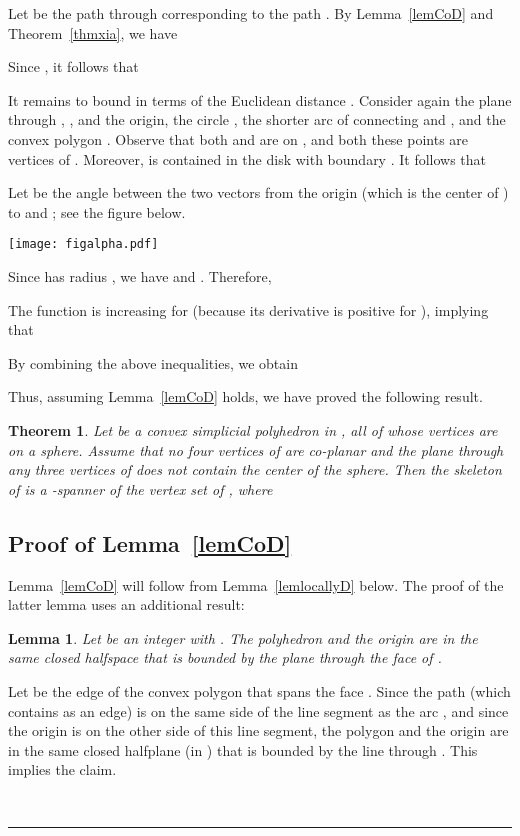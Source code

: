 \documentclass[12pt]{article}
\newtheorem{theorem}{Theorem}
\newtheorem{lemma}{Lemma}
\newcommand{\qed}{\rule{0.5em}{1.5ex}}
\newcommand{\fqed}{{\hfill~\qed}}
\newenvironment{proof}{{\noindent \bf Proof.}}
                      {{\hfill \fqed} \vspace{1em}}
\begin{document}
Let  be the path through  
corresponding to the path . By Lemma~\ref{lemCoD} and 
Theorem~\ref{thmxia}, we have 

Since , it follows that 
 

It remains to bound  in terms of the Euclidean distance 
. Consider again the plane  through , , and the 
origin, the circle , the shorter arc 
 of  connecting  and , and the convex polygon 
. Observe that both  and  are on , 
and both these points are vertices of . Moreover,  is 
contained in the disk with boundary . It follows that 
 

Let  be the angle between the two vectors from the 
origin (which is the center of ) to  and ; see the figure 
below. 

\begin{center}
\texttt{[image: figalpha.pdf]}
\end{center}

Since  has radius , we have  and 
. Therefore, 

The function  is increasing for  
(because its derivative is positive for ), implying 
that

By combining the above inequalities, we obtain 

Thus, assuming Lemma~\ref{lemCoD} holds, we have proved the following 
result. 

\begin{theorem}   \label{thm999}  
Let  be a convex simplicial polyhedron in , all of whose 
vertices are on a sphere. Assume that no four vertices of  are 
co-planar and the plane through any three vertices of  does not 
contain the center of the sphere. Then the skeleton of  is a 
-spanner of the vertex set of , where 
 
\end{theorem} 


\subsection{Proof of Lemma~\ref{lemCoD}}  \label{seclemCoD}  
Lemma~\ref{lemCoD} will follow from Lemma~\ref{lemlocallyD} below.  
The proof of the latter lemma uses an additional result: 

\begin{lemma}   \label{lembelow}
Let  be an integer with . The polyhedron  and the 
origin are in the same closed halfspace that is bounded by the plane 
through the face  of .  
\end{lemma}
\begin{proof} 
Let  be the edge of the convex polygon  that spans the 
face . Since the path  (which contains  as an edge) 
is on the same side of the line segment  as the arc , and 
since the origin is on the other side of this line segment, the polygon 
 and the origin are in the same closed halfplane (in ) 
that is bounded by the line through . This implies the claim. 
\end{proof} 
\end{document}

